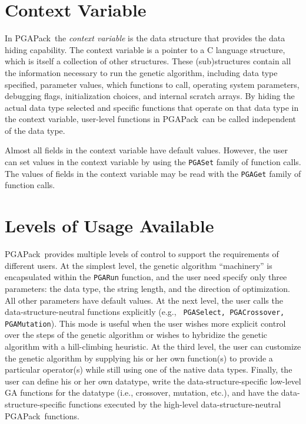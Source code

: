 \documentclass{report}
\newcommand{\pga}{PGAPack}
\begin{document}
\section{Context Variable}\label{sec:context}

In \pga\ the {\em context variable} is the data structure that provides the
data hiding capability.  The context variable is a pointer to a C language
structure, which is itself a collection of other structures.  These
(sub)structures contain all the information necessary to run the genetic
algorithm, including data type specified, parameter values, which functions to
call, operating system parameters, debugging flags, initialization choices,
and internal scratch arrays.  By hiding the actual data type selected and
specific functions that operate on that data type in the context variable,
user-level functions in \pga\ can be called independent of the data type.

Almost all fields in the context variable have default values.  However, the
user can set values in the context variable by using the {\tt PGASet} family
of function calls.  The values of fields in the context variable may be read
with the {\tt PGAGet} family of function calls.

\section{Levels of Usage Available}\label{sec:usage}

\pga\ provides multiple levels of control to support the requirements of
different users.  At the simplest level, the genetic algorithm ``machinery''
is encapsulated within the {\tt PGARun} function, and the user need specify
only three parameters: the data type, the string length, and the direction of
optimization. All other parameters have default values.  At the next level,
the user calls the data-structure-neutral functions explicitly (e.g., {\tt
PGASelect, PGACrossover, PGAMutation}).  This mode is useful when the
user wishes more explicit control over the steps of the genetic algorithm or
wishes to hybridize the genetic algorithm with a hill-climbing heuristic.  At
the third level, the user can customize the genetic algorithm by supplying his
or her own function(s) to provide a particular operator(s) while still using
one of the native data types.  Finally, the user can define his or her own
datatype, write the data-structure-specific low-level GA functions for the
datatype (i.e., crossover, mutation, etc.), and have the
data-structure-specific functions executed by the high-level
data-structure-neutral \pga\ functions.
\end{document}
